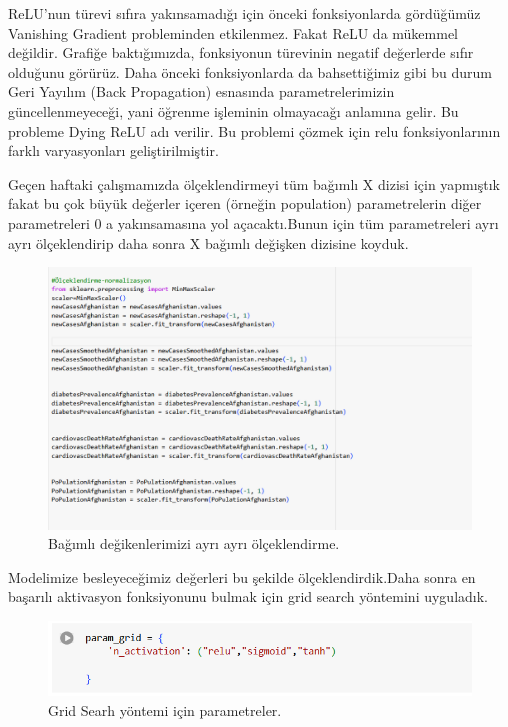 \documentclass[12pt, a4paper]{article}
\begin{document}
	ReLU’nun türevi sıfıra yakınsamadığı için önceki fonksiyonlarda gördüğümüz Vanishing Gradient probleminden etkilenmez. Fakat ReLU da mükemmel değildir.
	\newpage
	Grafiğe baktığımızda, fonksiyonun türevinin negatif değerlerde sıfır olduğunu görürüz. Daha önceki fonksiyonlarda da bahsettiğimiz gibi bu durum Geri Yayılım (Back Propagation) esnasında parametrelerimizin güncellenmeyeceği, yani öğrenme işleminin olmayacağı anlamına gelir. Bu probleme Dying ReLU adı verilir. Bu problemi çözmek için relu fonksiyonlarının farklı	varyasyonları geliştirilmiştir.\cite{Aktivasyon}
	
	Geçen haftaki çalışmamızda ölçeklendirmeyi tüm bağımlı X dizisi için yapmıştık fakat bu çok büyük değerler içeren (örneğin population) parametrelerin diğer parametreleri 0 a yakınsamasına yol açacaktı.Bunun için tüm parametreleri ayrı ayrı ölçeklendirip daha sonra X bağımlı değişken dizisine koyduk.
	\begin{figure}[!h]
		\centering
		\includegraphics{6.6.png}
		\caption{Bağımlı değikenlerimizi ayrı ayrı ölçeklendirme.}
	\end{figure}
	\newpage Modelimize besleyeceğimiz değerleri bu şekilde ölçeklendirdik.Daha sonra en başarılı aktivasyon fonksiyonunu bulmak için grid search yöntemini uyguladık.
	\begin{figure}[!h]
		\centering
		\includegraphics{6.7.png}
		\caption{Grid Searh yöntemi için parametreler.}
	\end{figure}
\end{document}
